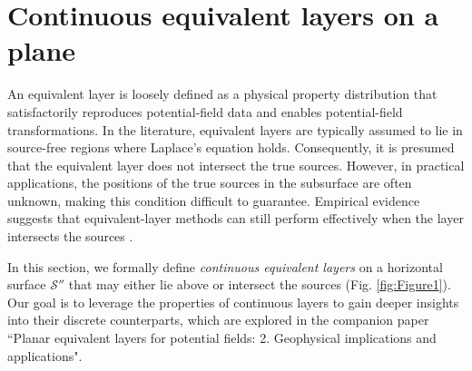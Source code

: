 \section{Continuous equivalent layers on a plane}
\label{eq:planar_eqlayer}

An equivalent layer is loosely defined as a physical property distribution that satisfactorily 
reproduces potential-field data and enables potential-field transformations. 
In the literature, equivalent layers are typically assumed to lie in source-free regions where 
Laplace’s equation holds. Consequently, it is presumed that the equivalent layer does not intersect 
the true sources. However, in practical applications, the positions of the true sources in the subsurface 
are often unknown, making this condition difficult to guarantee.
Empirical evidence suggests that equivalent-layer methods can still perform effectively 
when the layer intersects the sources \citep[e.g.,][]{gonzalez_etal2022}.

In this section, we formally define \textit{continuous equivalent layers} 
on a horizontal surface $\mathcal{S}''$ that may either lie above or intersect the sources (Fig. \ref{fig:Figure1}). 
Our goal is to leverage the properties of continuous layers to gain deeper insights into their discrete counterparts, 
which are explored in the companion paper 
``Planar equivalent layers for potential fields: 2. Geophysical implications and applications".

